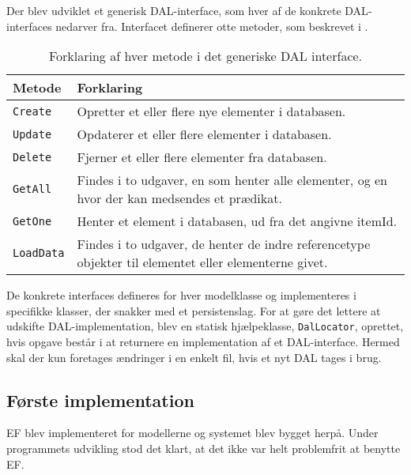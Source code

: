 Der blev udviklet et generisk \ac{DAL}-interface, som hver af de konkrete \ac{DAL}-interfaces nedarver fra.
Interfacet definerer otte metoder, som beskrevet i .

\begin{table}[h]
    \begin{tabular}{p{2cm}|p{13cm}}
    \textbf{Metode}   & \textbf{Forklaring}       \\ \hline
    \texttt{Create}   & Opretter et eller flere nye elementer i databasen.                                           \\ \hline
    \texttt{Update}   & Opdaterer et eller flere elementer i databasen.                                              \\ \hline
    \texttt{Delete}   & Fjerner et eller flere elementer fra databasen.                                              \\ \hline
    \texttt{GetAll}   & Findes i to udgaver, en som henter alle elementer, og en hvor der kan medsendes et prædikat. \\ \hline
    \texttt{GetOne}   & Henter et element i databasen, ud fra det angivne itemId.                                    \\ \hline
    \texttt{LoadData} & Findes i to udgaver, de henter de indre referencetype objekter til elementet eller elementerne givet. \\ \hline
    \end{tabular}
    \caption{Forklaring af hver metode i det generiske DAL interface.}
    \label{tab:ourExtCrud}
\end{table}

De konkrete interfaces defineres for hver modelklasse og implementeres i specifikke klasser, der snakker med et persistenslag.
For at gøre det lettere at udskifte \ac{DAL}-implementation, blev en statisk hjælpeklasse, \texttt{DalLocator}, oprettet, hvis opgave består i at returnere en implementation af et \ac{DAL}-interface. Hermed skal der kun foretages ændringer i en enkelt fil, hvis et nyt DAL tages i brug.


\subsection{Første implementation}

\acl{EF} blev implementeret for modellerne og systemet blev bygget herpå.
Under programmets udvikling stod det klart, at det ikke var helt problemfrit at benytte \ac{EF}.

